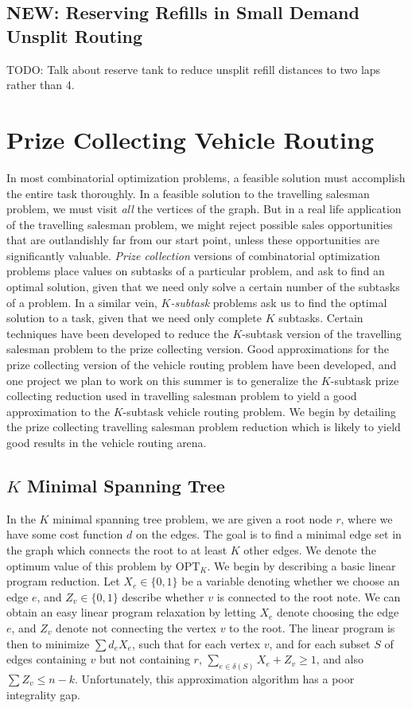\documentclass{article}
\theoremstyle{plain}
\begin{document}
\subsection{NEW: Reserving Refills in Small Demand Unsplit Routing}

TODO: Talk about reserve tank to reduce unsplit refill distances to two laps rather than 4.

\section{Prize Collecting Vehicle Routing}

In most combinatorial optimization problems, a feasible solution must accomplish the entire task thoroughly. In a feasible solution to the travelling salesman problem, we must visit {\it all} the vertices of the graph. But in a real life application of the travelling salesman problem, we might reject possible sales opportunities that are outlandishly far from our start point, unless these opportunities are significantly valuable. {\it Prize collection} versions of combinatorial optimization problems place values on subtasks of a particular problem, and ask to find an optimal solution, given that we need only solve a certain number of the subtasks of a problem. In a similar vein, {\it $K$-subtask} problems ask us to find the optimal solution to a task, given that we need only complete $K$ subtasks. Certain techniques have been developed to reduce the $K$-subtask version of the travelling salesman problem to the prize collecting version. Good approximations for the prize collecting version of the vehicle routing problem have been developed, and one project we plan to work on this summer is to generalize the $K$-subtask prize collecting reduction used in travelling salesman problem to yield a good approximation to the $K$-subtask vehicle routing problem. We begin by detailing the prize collecting travelling salesman problem reduction which is likely to yield good results in the vehicle routing arena.

\subsection{$K$ Minimal Spanning Tree}

In the $K$ minimal spanning tree problem, we are given a root node $r$, where we have some cost function $d$ on the edges. The goal is to find a minimal edge set in the graph which connects the root to at least $K$ other edges. We denote the optimum value of this problem by $\text{OPT}_K$. We begin by describing a basic linear program reduction. Let $X_e \in \{ 0, 1 \}$ be a variable denoting whether we choose an edge $e$, and $Z_v \in \{ 0, 1 \}$ describe whether $v$ is connected to the root note. We can obtain an easy linear program relaxation by letting $X_e$ denote choosing the edge $e$, and $Z_v$ denote not connecting the vertex $v$ to the root. The linear program is then to minimize $\sum d_eX_e$, such that for each vertex $v$, and for each subset $S$ of edges containing $v$ but not containing $r$, $\sum_{e \in \delta(S)} X_e + Z_v \geq 1$, and also $\sum Z_v \leq n - k$. Unfortunately, this approximation algorithm has a poor integrality gap.
\end{document}
